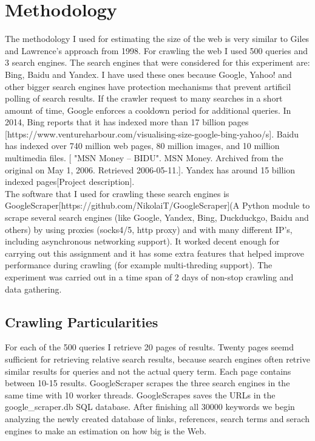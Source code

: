 \documentclass{sig-alternate}
\begin{document}
\section{Methodology}

The methodology I used for estimating the size of the web is very similar to Giles and Lawrence's approach from 1998. For crawling the web I used 500 queries and 3 search engines. The search engines that were considered for this experiment are: Bing, Baidu and Yandex. I have used these ones because Google, Yahoo! and other bigger search engines have protection mechanisms that prevent artificil polling of search results. If the crawler request to many searches in a short amount of time, Google enforces a cooldown period for additional queries. In 2014, Bing reports that it has indexed more than 17 billion pages [https://www.ventureharbour.com/visualising-size-google-bing-yahoo/s]. Baidu has indexed over 740 million web pages, 80 million images, and 10 million multimedia files. [ "MSN Money – BIDU". MSN Money. Archived from the original on May 1, 2006. Retrieved 2006-05-11.]. Yandex has around 15 billion indexed pages[Project description].\\

The software that I used for crawling these search engines is GoogleScraper[https://github.com/NikolaiT/GoogleScraper](A Python module to scrape several search engines (like Google, Yandex, Bing, Duckduckgo, Baidu and others) by using proxies (socks4/5, http proxy) and with many different IP's, including asynchronous networking support). It worked decent enough for carrying out this assignment and it has some extra features that helped improve performance during crawling (for example multi-threding support). The experiment was carried out in a time span of 2 days of non-stop crawling and data gathering.\\ 

\subsection{Crawling Particularities}

For each of the 500 queries I retrieve 20 pages of results. Twenty pages seemd sufficient for retrieving relative search results, because search engines often retrive similar results for queries and not the actual query term. Each page contains between 10-15 results. GoogleScraper scrapes the three search engines in the same time with 10 worker threads. GoogleScrapes saves the URLs in the google\_scraper.db SQL database. After finishing all 30000 keywords we begin analyzing the newly created database of links, references, search terms and serach engines to make an estimation on how big is the Web.\\
\end{document}
